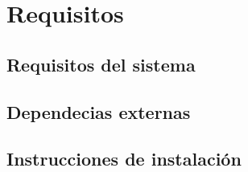 	\section{Requisitos}
	\subsection{Requisitos del sistema}
	\subsection{Dependecias externas}
	\subsection{Instrucciones de instalaci\'on}